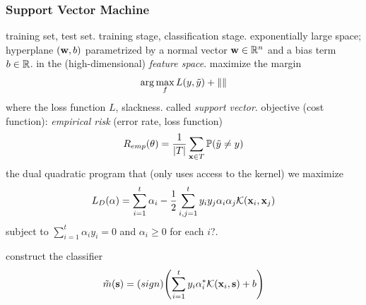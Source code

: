 \subsubsection*{Support Vector Machine}
training set, test set.
training stage, classification stage.
exponentially large space;
hyperplane $(\vb{w},b)$ parametrized by a normal vector $\vb{w}\in\mathbb{R}^n$ and a bias term $b\in\mathbb{R}$. in the (high-dimensional) \emph{feature space}.
maximize the margin
\begin{equation}
	\arg \max_f  L(y,\tilde{y}) + \norm{}
\end{equation}
where the loss function $L$, slackness. called \emph{support vector}.
objective (cost function): \emph{empirical risk} (error rate, loss function)
\begin{equation}
	R_{emp}(\vb{\theta}) = \frac{1}{\abs{T}}
	\sum_{\vb{x}\in T} \mathbb{P} (\tilde{y} \neq y)
\end{equation}
the dual quadratic program that (only uses access to the kernel)
we maximize 
\begin{equation}
	L_D(\alpha) = \sum_{i=1}^t \alpha_i - \frac{1}{2}\sum_{i,j=1}^t y_i y_j \alpha_i \alpha_j \mathcal{K}(\vb{x}_i,\vb{x}_j)
\end{equation}
subject to $\sum_{i=1}^t \alpha_i y_i = 0$ and $\alpha_i\ge 0$ for each $i$?.

construct the classifier
\begin{equation}
	\tilde{m}(\vb{s}) = \textup(sign) \qty(
		\sum_{i=1}^t y_i \alpha_i^* \mathcal{K}(\vb{x}_i,\vb{s}) + b
	)
\end{equation}

